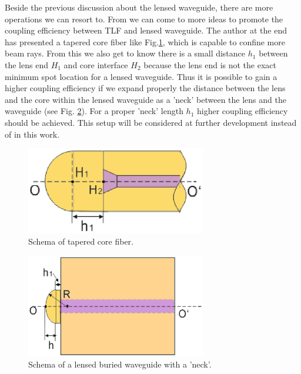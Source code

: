 Beside the previous discussion about the lensed waveguide, there are more operations we can resort to. From \cite{integrated_coupling_between_LD_SMF} we can come to more ideas to promote the coupling efficiency between TLF and lensed waveguide. The author at the end has presented a tapered core fiber like Fig.\ref{fig:tapered_core_fiber}, which is capable to confine more beam rays. From this we also get to know there is a small distance $h_{1}$ between the lens end $H_{1}$ and core interface $H_{2}$ because the lens end is not the exact minimum spot location for a lensed waveguide. Thus it is possible to gain a higher coupling efficiency if we expand properly the distance between the lens and the core within the lensed waveguide as a 'neck' between the lens and the waveguide (see Fig. \ref{fig:lensed_waveguide_neck}). For a proper 'neck' length $h_{1}$ higher coupling efficiency should be achieved. This setup will be considered at further development instead of in this work.
\begin{figure}[!ht]
\centering
\includegraphics[width=0.7\textwidth]{bilder/tapered_core_fiber}
\caption {Schema of tapered core fiber\cite{integrated_coupling_between_LD_SMF}.}
\label{fig:tapered_core_fiber}
\end{figure}
\begin{figure}[!ht]
\centering
\includegraphics[width=0.7\textwidth]{bilder/lensed_waveguide_neck}
\caption {Schema of a lensed buried waveguide with a 'neck'.}
\label{fig:lensed_waveguide_neck}
\end{figure}
